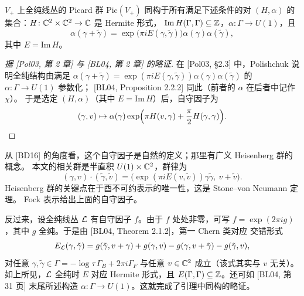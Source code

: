 
\begin{lemma}\label{lem:picard}
$V_+$ 上全纯线丛的 Picard 群 $\mathrm{Pic}(V_+)$ 同构于所有满足下述条件的对
$(H,\alpha)$ 的集合：$H\colon\mathbb{C}^2\times\mathbb{C}^2\to\mathbb{C}$ 是 Hermite 形式，
$\mathrm{Im}\,H(\Gamma,\Gamma)\subseteq\mathbb{Z}$，$\alpha\colon\Gamma\to U(1)$，且
\[
\alpha(\gamma+\tilde\gamma)=\exp\bigl(\pi iE(\gamma,\tilde\gamma)\bigr)
\alpha(\gamma)\alpha(\tilde\gamma),
\]
其中 $E=\mathrm{Im}\,H$。
\end{lemma}

\begin{proof}[{据 [Pol03, 第 2 章] 与 [BL04, 第 2 章] 的略证}]
在 [Pol03, §2.3] 中，Polishchuk 说明全纯结构由满足
$\alpha(\gamma+\tilde\gamma)=\exp(\pi iE(\gamma,\tilde\gamma))\alpha(\gamma)
\alpha(\tilde\gamma)$ 的 $\alpha\colon\Gamma\to U(1)$ 参数化；
[BL04, Proposition 2.2.2] 同此（前者的 $\alpha$ 在后者中记作 $\chi$）。
于是选定 $(H,\alpha)$（其中 $E=\mathrm{Im}\,H$）后，自守因子为
\[
(\gamma,v)\mapsto\alpha(\gamma)
\exp\Bigl(\pi H(v,\gamma)+\frac{\pi}{2}H(\gamma,\gamma)\Bigr).
\]
\end{proof}

从 [BD16] 的角度看，这个自守因子是自然的定义；那里有广义 Heisenberg 群的概念。
本文的相关群是半直积 $U(1)\times\mathbb{C}^2$，群律为
\[
(\gamma,v)\cdot(\tilde\gamma,\tilde v)
=\bigl(\exp(\pi iE(v,\tilde v))\gamma\tilde\gamma,\ v+\tilde v\bigr).
\]
Heisenberg 群的关键点在于酉不可约表示的唯一性，这是 Stone--von Neumann 定理。
Fock 表示给出上面的自守因子。

反过来，设全纯线丛 $\mathcal{L}$ 有自守因子 $f$。由于 $f$ 处处非零，可写
$f=\exp(2\pi ig)$，其中 $g$ 全纯。于是由 [BL04, Theorem 2.1.2]，第一 Chern 类对应
交错形式
\[
E_{\mathcal{L}}(\gamma,\tilde\gamma)
=g(\tilde\gamma,v+\gamma)+g(\gamma,v)-g(\gamma,v+\tilde\gamma)-g(\tilde\gamma,v),
\]
对任意 $\gamma,\tilde\gamma\in\Gamma=-\log\tau\,\Gamma_B+2\pi i\Gamma_F$ 与任意
$v\in\mathbb{C}^2$ 成立（该式其实与 $v$ 无关）。如上所见，$\mathcal{L}$ 全纯时 $E$ 对应 Hermite
形式，且 $E(\Gamma,\Gamma)\subseteq\mathbb{Z}$。还可如 [BL04, 第 31 页] 末尾所述构造
$\alpha\colon\Gamma\to U(1)$。这就完成了引理中同构的略证。

